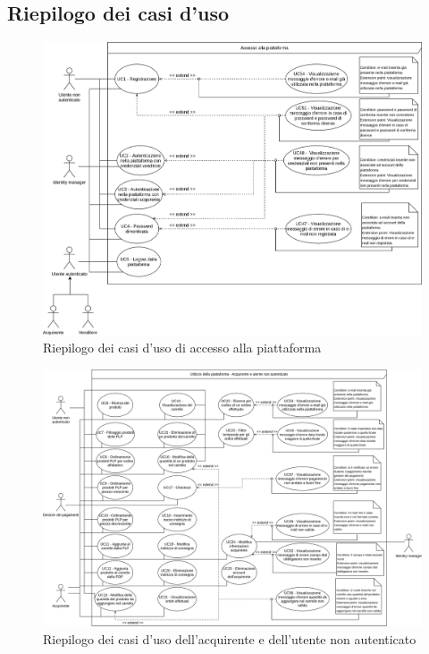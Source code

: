 \subsection{Riepilogo dei casi d'uso}

\begin{figure}[H]
    \centering
    \includegraphics[scale=0.42]{Immagini/DiagrammiUC/AccessoAllaPiattaforma.png}
    \caption{Riepilogo dei casi d'uso di accesso alla piattaforma} 
    \label{fig:riepilogo-accesso-alla-piattaforma}
\end{figure}

\begin{figure}[H]
    \centering
    \includegraphics[width=\textwidth]{Immagini/DiagrammiUC/UsoPiattaformaAcquirenteUtenteNonAutenticato.png}
    \caption{Riepilogo dei casi d'uso dell'acquirente e dell'utente non autenticato}
    \label{fig:uso-piattaforma-acquirente-utente-non-autenticato}
\end{figure}
